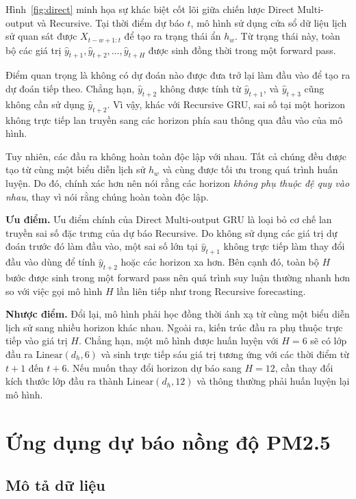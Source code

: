 \documentclass[12pt,oneside]{report}
\begin{document}
Hình~\ref{fig:direct} minh họa sự khác biệt cốt lõi giữa chiến lược Direct Multi-output và Recursive. Tại thời điểm dự báo $t$, mô hình sử dụng cửa sổ dữ liệu lịch sử quan sát được $X_{t-w+1:t}$ để tạo ra trạng thái ẩn $h_w$. Từ trạng thái này, toàn bộ các giá trị
$\hat y_{t+1},\hat y_{t+2},\ldots,\hat y_{t+H}$
được sinh đồng thời trong một forward pass.

Điểm quan trọng là không có dự đoán nào được đưa trở lại làm đầu vào để tạo ra dự đoán tiếp theo. Chẳng hạn, $\hat y_{t+2}$ không được tính từ $\hat y_{t+1}$, và $\hat y_{t+3}$ cũng không cần sử dụng $\hat y_{t+2}$. Vì vậy, khác với Recursive GRU, sai số tại một horizon không trực tiếp lan truyền sang các horizon phía sau thông qua đầu vào của mô hình.

Tuy nhiên, các đầu ra không hoàn toàn độc lập với nhau. Tất cả chúng đều được tạo từ cùng một biểu diễn lịch sử $h_w$ và cùng được tối ưu trong quá trình huấn luyện. Do đó, chính xác hơn nên nói rằng các horizon \textit{không phụ thuộc đệ quy vào nhau}, thay vì nói rằng chúng hoàn toàn độc lập.

\textbf{Ưu điểm.}
Ưu điểm chính của Direct Multi-output GRU là loại bỏ cơ chế lan truyền sai số đặc trưng của dự báo Recursive. Do không sử dụng các giá trị dự đoán trước đó làm đầu vào, một sai số lớn tại $\hat y_{t+1}$ không trực tiếp làm thay đổi đầu vào dùng để tính $\hat y_{t+2}$ hoặc các horizon xa hơn. Bên cạnh đó, toàn bộ $H$ bước được sinh trong một forward pass nên quá trình suy luận thường nhanh hơn so với việc gọi mô hình $H$ lần liên tiếp như trong Recursive forecasting.

\textbf{Nhược điểm.}
Đổi lại, mô hình phải học đồng thời ánh xạ từ cùng một biểu diễn lịch sử sang nhiều horizon khác nhau. Ngoài ra, kiến trúc đầu ra phụ thuộc trực tiếp vào giá trị $H$. Chẳng hạn, một mô hình được huấn luyện với $H=6$ sẽ có lớp đầu ra $\text{Linear}(d_h,6)$ và sinh trực tiếp sáu giá trị tương ứng với các thời điểm từ $t+1$ đến $t+6$. Nếu muốn thay đổi horizon dự báo sang $H=12$, cần thay đổi kích thước lớp đầu ra thành $\text{Linear}(d_h,12)$ và thông thường phải huấn luyện lại mô hình.

\chapter{Ứng dụng dự báo nồng độ PM2.5}

\section{Mô tả dữ liệu}
\end{document}
